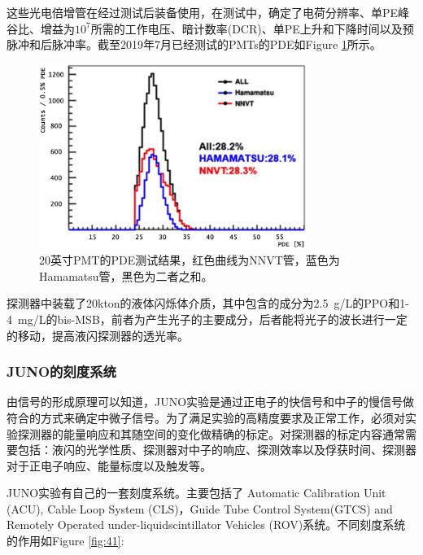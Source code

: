 \documentclass[10pt,a4paper]{article}
\begin{document}
这些光电倍增管在经过测试后装备使用，在测试中，确定了电荷分辨率、单PE峰谷比、增益为$10^7$所需的工作电压、暗计数率(DCR)、单PE上升和下降时间以及预脉冲和后脉冲率。截至2019年7月已经测试的PMTs的PDE如Figure \ref{fig:4}所示\cite{Steiger:2019khq}。


\begin{figure}[H]
 \centering
 \includegraphics[height=6cm]{images/pmt测试.png}
 \caption{20英寸PMT的PDE测试结果，红色曲线为NNVT管，蓝色为Hamamatsu管，黑色为二者之和。}
 \label{fig:4}
\end{figure}


探测器中装载了20kton的液体闪烁体介质，其中包含的成分为\SI{2.5}{g/L}的PPO和1-\SI{4}{mg/L}的bis-MSB，前者为产生光子的主要成分，后者能将光子的波长进行一定的移动，提高液闪探测器的透光率。

\subsubsection{JUNO的刻度系统}\label{sub:5}
由信号的形成原理可以知道，JUNO实验是通过正电子的快信号和中子的慢信号做符合的方式来确定中微子信号。为了满足实验的高精度要求及正常工作，必须对实验探测器的能量响应和其随空间的变化做精确的标定。对探测器的标定内容通常需要包括：液闪的光学性质、探测器对中子的响应、探测效率以及俘获时间、探测器对于正电子响应、能量标度以及触发等。

JUNO实验有自己的一套刻度系统。主要包括了 Automatic Calibration Unit (ACU),
Cable Loop System (CLS)，Guide Tube Control System(GTCS) and Remotely Operated under-liquidscintillator Vehicles (ROV)系统。不同刻度系统的作用如Figure \ref{fig:41}:
\end{document}
